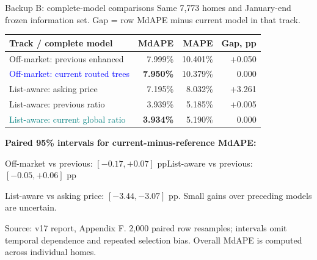 \documentclass[aspectratio=169,20pt]{beamer}
\newcommand{\smalltext}{\fontsize{15}{19}\selectfont}
\newcommand{\tinytext}{\fontsize{12}{15}\selectfont}
\newcommand{\sourceline}[1]{\par{\tinytext\color{Muted}#1\par}}
\begin{document}
\begin{frame}[t]{Backup B: complete-model comparisons}
\relax
{\smalltext Same 7,773 homes and January-end frozen information set. Gap = row MdAPE minus current model in that track.}\par
\vspace{3mm}
{\fontsize{18}{23}\selectfont
\renewcommand{\arraystretch}{1.35}
\noindent\begin{tabular*}{\textwidth}{@{}l@{\extracolsep{\fill}}rrr@{}}
\toprule
\textbf{Track / complete model} & \textbf{MdAPE} & \textbf{MAPE} & \textbf{Gap, pp}\\
\midrule
Off-market: previous enhanced & 7.999\% & 10.401\% & +0.050\\
\textcolor{Blue}{Off-market: current routed trees} & \textbf{7.950\%} & 10.379\% & 0.000\\
List-aware: asking price & 7.195\% & 8.032\% & +3.261\\
List-aware: previous ratio & 3.939\% & 5.185\% & +0.005\\
\textcolor{Teal}{List-aware: current global ratio} & \textbf{3.934\%} & 5.190\% & 0.000\\
\bottomrule
\end{tabular*}}\par
\vspace{6mm}
{\smalltext\textbf{Paired 95\% intervals for current-minus-reference MdAPE:}

Off-market vs previous: $[-0.17,+0.07]$ pp\quad\textbullet\quad List-aware vs previous: $[-0.05,+0.06]$ pp

List-aware vs asking price: $[-3.44,-3.07]$ pp. Small gains over preceding models are uncertain.}
\vfill
\sourceline{Source: v17 report, Appendix F. 2,000 paired row resamples; intervals omit temporal dependence and repeated selection bias. Overall MdAPE is computed across individual homes.}
\end{frame}
\end{document}
